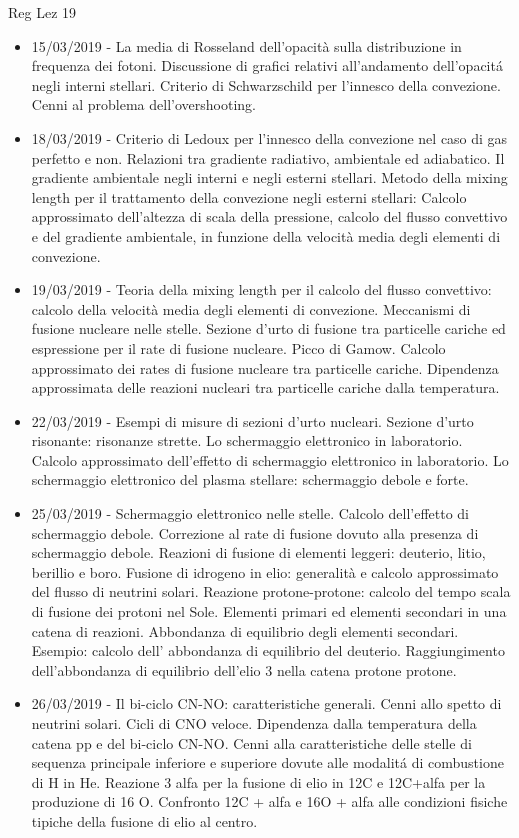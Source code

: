 \begin{frame}[allowframebreaks]{Reg Lez 19}
\begin{itemize}
\item  15/03/2019 - La media di Rosseland dell'opacità sulla distribuzione in frequenza dei fotoni. Discussione di grafici relativi all'andamento dell'opacit\'a negli interni stellari. Criterio di Schwarzschild per l'innesco della convezione. Cenni al problema dell'overshooting.
\item 18/03/2019 - Criterio di Ledoux per l'innesco della convezione nel caso di gas perfetto e non. Relazioni tra gradiente radiativo, ambientale ed adiabatico. Il gradiente ambientale negli interni e negli esterni stellari. Metodo della mixing length per il trattamento della convezione negli esterni stellari: Calcolo approssimato dell'altezza di scala della pressione, calcolo del flusso convettivo e del gradiente ambientale, in funzione della velocità media degli elementi di convezione.
\item 19/03/2019 - Teoria della mixing length per il calcolo del flusso convettivo: calcolo della velocità media degli elementi di convezione. Meccanismi di fusione nucleare nelle stelle. Sezione d'urto di fusione tra particelle cariche ed espressione per il rate di fusione nucleare. Picco di Gamow. Calcolo approssimato dei rates di fusione nucleare tra particelle cariche. Dipendenza approssimata delle reazioni nucleari tra particelle cariche dalla temperatura.
\item 22/03/2019 - Esempi di misure di sezioni d'urto nucleari. Sezione d'urto risonante: risonanze strette. Lo schermaggio elettronico in laboratorio. Calcolo approssimato dell'effetto di schermaggio elettronico in laboratorio. Lo schermaggio elettronico del plasma stellare: schermaggio debole e forte.
\item 25/03/2019 - Schermaggio elettronico nelle stelle. Calcolo dell'effetto di schermaggio debole. Correzione al rate di fusione dovuto alla presenza di schermaggio debole. Reazioni di fusione di elementi leggeri: deuterio, litio, berillio e boro. Fusione di idrogeno in elio: generalità e calcolo approssimato del flusso di neutrini solari. Reazione protone-protone: calcolo del tempo scala di fusione dei protoni nel Sole. Elementi primari ed elementi secondari in una catena di reazioni. Abbondanza di equilibrio degli elementi secondari. Esempio: calcolo dell' abbondanza di equilibrio del deuterio. Raggiungimento dell'abbondanza di equilibrio dell'elio 3 nella catena protone protone.
\item 26/03/2019 - Il bi-ciclo CN-NO: caratteristiche generali. Cenni allo spetto di neutrini solari. Cicli di CNO veloce. Dipendenza dalla temperatura della catena pp e del bi-ciclo CN-NO. Cenni alla caratteristiche delle stelle di sequenza principale inferiore e superiore dovute alle modalit\'a di combustione di H in He. Reazione 3 alfa per la fusione di elio in 12C e 12C+alfa per la produzione di 16 O. Confronto 12C + alfa e 16O + alfa alle condizioni fisiche tipiche della fusione di elio al centro.

\end{itemize}
\end{frame}
